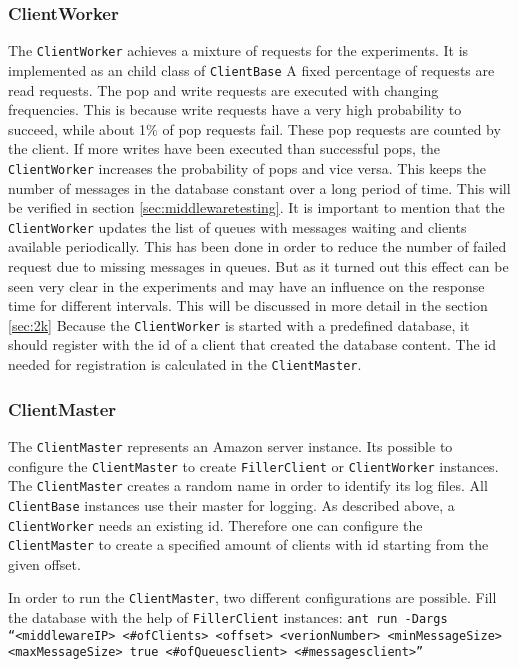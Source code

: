 \documentclass[
10pt, %
a4paper, %
oneside, %
headinclude,footinclude, %
BCOR5mm, %
]{scrartcl}
\begin{document}
\subsubsection{ClientWorker}
The \texttt{ClientWorker} achieves a mixture of requests for the experiments. It is implemented as an child class of \texttt{ClientBase} A fixed percentage of requests are read requests. The pop and write requests are executed with changing frequencies. This is because write requests have a very high probability to succeed, while about 1\% of pop requests fail. These pop requests are counted by the client. If more writes have been executed than successful pops, the \texttt{ClientWorker} increases the probability of pops and vice versa. This keeps the number of messages in the database constant over a long period of time. This will be verified in section \vref{sec:middlewaretesting}. It is important to mention that the \texttt{ClientWorker} updates the list of queues with messages waiting and clients available periodically. This has been done in order to reduce the number of failed request due to missing messages in queues. But as it turned out this effect can be seen very clear in the experiments and may have an influence on the response time for different intervals. This will be discussed in more detail in the section \vref{sec:2k}
Because the \texttt{ClientWorker} is started with a predefined database, it should register with the id of a client that created the database content. The id needed for registration is calculated in the \texttt{ClientMaster}.

\subsubsection{ClientMaster}
The \texttt{ClientMaster} represents an Amazon server instance. Its possible to configure the \texttt{ClientMaster} to create \texttt{FillerClient} or \texttt{ClientWorker} instances. The \texttt{ClientMaster} creates a random name in order to identify its log files. All \texttt{ClientBase} instances use their master for logging. As described above, a \texttt{ClientWorker} needs an existing id. Therefore one can configure the \texttt{ClientMaster} to create a specified amount of clients with id starting from the given offset.

In order to run the \texttt{ClientMaster}, two different configurations are possible. 
Fill the database with the help of \texttt{FillerClient} instances:
\texttt{ant run -Dargs ``<middlewareIP> <\#ofClients> <offset> <verionNumber> <minMessageSize> <maxMessageSize> true <\#ofQueues\/client> <\#messages\/client>''}
\end{document}
